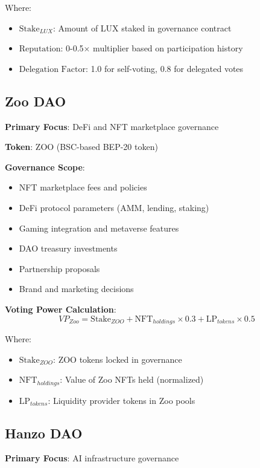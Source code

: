 Where:
\begin{itemize}
\item $\text{Stake}_{LUX}$: Amount of LUX staked in governance contract
\item $\text{Reputation}$: 0-0.5× multiplier based on participation history
\item $\text{Delegation Factor}$: 1.0 for self-voting, 0.8 for delegated votes
\end{itemize}

\subsection{Zoo DAO}

\textbf{Primary Focus}: DeFi and NFT marketplace governance

\textbf{Token}: ZOO (BSC-based BEP-20 token)

\textbf{Governance Scope}:
\begin{itemize}
\item NFT marketplace fees and policies
\item DeFi protocol parameters (AMM, lending, staking)
\item Gaming integration and metaverse features
\item DAO treasury investments
\item Partnership proposals
\item Brand and marketing decisions
\end{itemize}

\textbf{Voting Power Calculation}:
\begin{equation}
VP_{Zoo} = \text{Stake}_{ZOO} + \text{NFT}_{holdings} \times 0.3 + \text{LP}_{tokens} \times 0.5
\end{equation}

Where:
\begin{itemize}
\item $\text{Stake}_{ZOO}$: ZOO tokens locked in governance
\item $\text{NFT}_{holdings}$: Value of Zoo NFTs held (normalized)
\item $\text{LP}_{tokens}$: Liquidity provider tokens in Zoo pools
\end{itemize}

\subsection{Hanzo DAO}

\textbf{Primary Focus}: AI infrastructure governance

